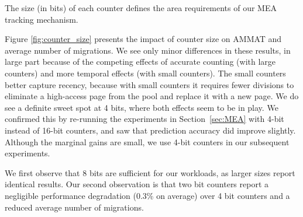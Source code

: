 The size (in bits) of each counter defines the area requirements of our MEA tracking mechanism.  

Figure \ref{fig:counter_size} presents the impact of counter size on AMMAT and average number of migrations. We see only minor differences in these results,
in large part because of the competing effects of accurate counting (with
large counters) and more temporal effects (with small counters).
The small counters better capture recency, because with small counters it
requires fewer divisions  to eliminate a high-access page from the pool and
replace it with a new page.  We do see a definite sweet spot at 4 bits,
where both effects seem to be in play.  We confirmed this by re-running the
experiments in Section~\ref{sec:MEA} with 4-bit instead of 16-bit counters,
and saw that prediction accuracy did improve slightly.  Although the marginal
gains are small, we use 4-bit counters in our subsequent experiments.


We first observe that 8 bits are sufficient for our workloads, as larger sizes report identical results. Our second observation is that two bit counters report a negligible performance degradation (0.3\% on average)  over 4 bit counters and a reduced average number of migrations.

